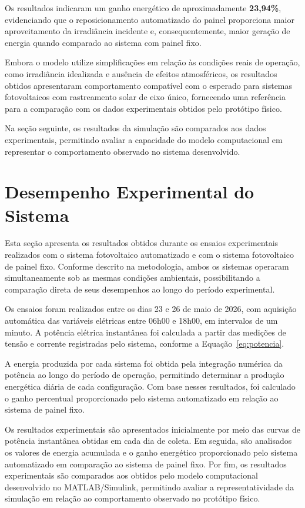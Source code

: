 Os resultados indicaram um ganho energético de aproximadamente \textbf{23,94\%}, evidenciando que o reposicionamento automatizado do painel proporciona maior aproveitamento da irradiância incidente e, consequentemente, maior geração de energia quando comparado ao sistema com painel fixo.

Embora o modelo utilize simplificações em relação às condições reais de operação, como irradiância idealizada e ausência de efeitos atmosféricos, os resultados obtidos apresentaram comportamento compatível com o esperado para sistemas fotovoltaicos com rastreamento solar de eixo único, fornecendo uma referência para a comparação com os dados experimentais obtidos pelo protótipo físico.

Na seção seguinte, os resultados da simulação são comparados aos dados experimentais, permitindo avaliar a capacidade do modelo computacional em representar o comportamento observado no sistema desenvolvido.

\section{Desempenho Experimental do Sistema}

Esta seção apresenta os resultados obtidos durante os ensaios experimentais realizados com o sistema fotovoltaico automatizado e com o sistema fotovoltaico de painel fixo. Conforme descrito na metodologia, ambos os sistemas operaram simultaneamente sob as mesmas condições ambientais, possibilitando a comparação direta de seus desempenhos ao longo do período experimental.

Os ensaios foram realizados entre os dias 23 e 26 de maio de 2026, com aquisição automática das variáveis elétricas entre 06h00 e 18h00, em intervalos de um minuto. A potência elétrica instantânea foi calculada a partir das medições de tensão e corrente registradas pelo sistema, conforme a Equação~\ref{eq:potencia}.

A energia produzida por cada sistema foi obtida pela integração numérica da potência ao longo do período de operação, permitindo determinar a produção energética diária de cada configuração. Com base nesses resultados, foi calculado o ganho percentual proporcionado pelo sistema automatizado em relação ao sistema de painel fixo.

Os resultados experimentais são apresentados inicialmente por meio das curvas de potência instantânea obtidas em cada dia de coleta. Em seguida, são analisados os valores de energia acumulada e o ganho energético proporcionado pelo sistema automatizado em comparação ao sistema de painel fixo. Por fim, os resultados experimentais são comparados aos obtidos pelo modelo computacional desenvolvido no MATLAB/Simulink, permitindo avaliar a representatividade da simulação em relação ao comportamento observado no protótipo físico.

